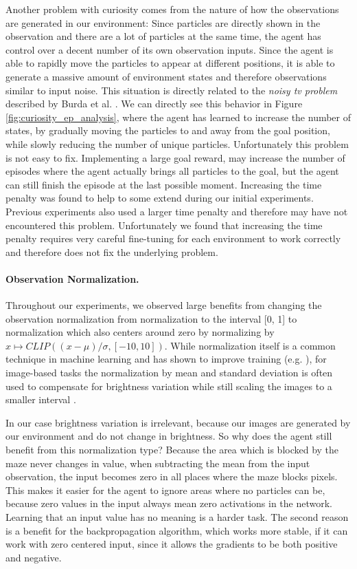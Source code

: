 Another problem with curiosity comes from the nature of how the observations are generated in our environment: Since particles are directly shown in the observation and there are a lot of particles at the same time, the agent has control over a decent number of its own observation inputs. Since the agent is able to rapidly move the particles to appear at different positions, it is able to generate a massive amount of environment states and therefore observations similar to input noise. This situation is directly related to the \textit{noisy tv problem} described by Burda et al. \cite{burda2018large}. We can directly see this behavior in Figure \ref{fig:curiosity_ep_analysis}, where the agent has learned to increase the number of states, by gradually moving the particles to and away from the goal position, while slowly reducing the number of unique particles. Unfortunately this problem is not easy to fix. Implementing a large goal reward, may increase the number of episodes where the agent actually brings all particles to the goal, but the agent can still finish the episode at the last possible moment. Increasing the time penalty was found to help to some extend during our initial experiments. Previous experiments \cite{huang2019,becker2020} also used a larger time penalty and therefore may have not encountered this problem. Unfortunately we found that increasing the time penalty requires very careful fine-tuning for each environment to work correctly and therefore does not fix the underlying problem.

\paragraph{Observation Normalization. } Throughout our experiments, we observed large benefits from changing the observation normalization from normalization to the interval [0, 1] to normalization which also centers around zero by normalizing by $x \mapsto CLIP((x - \mu)/\sigma, [-10, 10])$. While normalization itself is a common technique in machine learning and has shown to improve training (e.g. \cite{jayalakshmi2011statistical}), for image-based tasks the normalization by mean and standard deviation is often used to compensate for brightness variation while still scaling the images to a smaller interval \cite{pal2016preprocessing}. 

In our case brightness variation is irrelevant, because our images are generated by our environment and do not change in brightness. So why does the agent still benefit from this normalization type? Because the area which is blocked by the maze never changes in value, when subtracting the mean from the input observation, the input becomes zero in all places where the maze blocks pixels. This makes it easier for the agent to ignore areas where no particles can be, because zero values in the input always mean zero activations in the network. Learning that an input value has no meaning is a harder task. The second reason is a benefit for the backpropagation algorithm, which works more stable, if it can work with zero centered input, since it allows the gradients to be both positive and negative.

